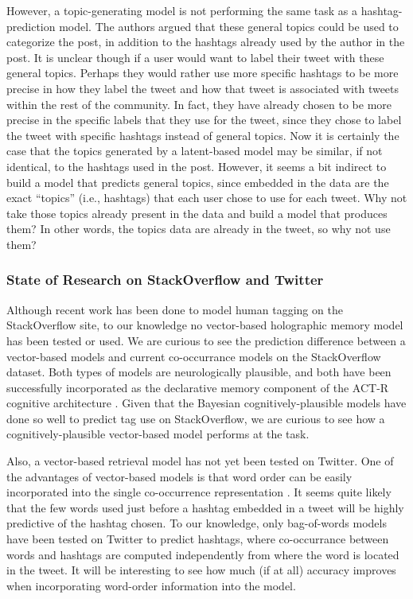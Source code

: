 \documentclass[man,floatsintext]{apa6}
\begin{document}
However, a topic-generating model is not performing the same task as a hashtag-prediction model.
The authors argued that these general topics could be used to categorize the post, in addition to the hashtags already used by the author in the post.
It is unclear though if a user would want to label their tweet with these general topics.
Perhaps they would rather use more specific hashtags to be more precise in how they label the tweet and how that tweet is associated with tweets within the rest of the community.
In fact, they have already chosen to be more precise in the specific labels that they use for the tweet, since they chose to label the tweet with specific hashtags instead of general topics.
Now it is certainly the case that the topics generated by a latent-based model may be similar, if not identical, to the hashtags used in the post.
However, it seems a bit indirect to build a model that predicts general topics, since embedded in the data are the exact ``topics'' (i.e., hashtags) that each user chose to use for each tweet.
Why not take those topics already present in the data and build a model that produces them?
In other words, the topics data are already in the tweet, so why not use them?

\subsubsection{State of Research on StackOverflow and Twitter}

Although recent work has been done to model human tagging on the StackOverflow site, to our knowledge no vector-based holographic memory model has been tested or used.
We are curious to see the prediction difference between a vector-based models and current co-occurrance models on the StackOverflow dataset.
Both types of models are neurologically plausible, and both have been successfully incorporated as the declarative memory component of the ACT-R cognitive architecture \parencite{Rutledge2007}. 
Given that the Bayesian cognitively-plausible models have done so well to predict tag use on StackOverflow, we are curious to see how a cognitively-plausible vector-based model performs at the task.

Also, a vector-based retrieval model has not yet been tested on Twitter.
One of the advantages of vector-based models is that word order can be easily incorporated into the single co-occurrence representation \parencite{Jones2007}.
It seems quite likely that the few words used just before a hashtag embedded in a tweet will be highly predictive of the hashtag chosen.
To our knowledge, only bag-of-words models have been tested on Twitter to predict hashtags, where co-occurrance between words and hashtags are computed independently from where the word is located in the tweet.
It will be interesting to see how much (if at all) accuracy improves when incorporating word-order information into the model.
\end{document}
